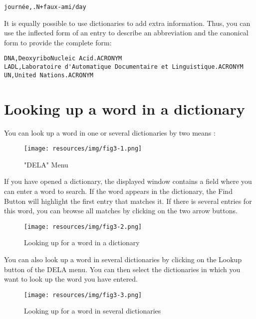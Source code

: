 \noindent
\texttt{journ\'ee,.N+faux-ami/day}


\bigskip
\noindent It is equally possible to use dictionaries to add extra information.
Thus, you can use the inflected form of an entry to describe an abbreviation and the
canonical form to provide the complete form:

\bigskip
\begin{verbatim}
DNA,DeoxyriboNucleic Acid.ACRONYM
LADL,Laboratoire d'Automatique Documentaire et Linguistique.ACRONYM
UN,United Nations.ACRONYM
\end{verbatim}


\section{Looking up a word in a dictionary}
\label{section-dictionary-lookup}
You can look up a word in one or several dictionaries by two means : 

\begin{figure}[h!]
\begin{center}
\texttt{[image: resources/img/fig3-1.png]}
\caption{"DELA" Menu}
\end{center}
\end{figure}

\bigskip
\noindent
If you have opened a dictionary, the displayed window contains a field where you can enter a word to search. If the word appears in the dictionary, the Find Button will highlight the first entry that matches it. If there is several entries for this word, you can browse all matches by clicking on the two arrow buttons.

\begin{figure}[h!]
\begin{center}
\texttt{[image: resources/img/fig3-2.png]}
\caption{Looking up for a word in a dictionary}
\end{center}
\end{figure}

\bigskip
\noindent
You can also look up a word in several dictionaries by clicking on the Lookup button of the DELA menu. You can then select the dictionaries in which you want to look up the word you have entered.

\begin{figure}[h!]
\begin{center}
\texttt{[image: resources/img/fig3-3.png]}
\caption{Looking up for a word in several dictionaries}
\end{center}
\end{figure}

